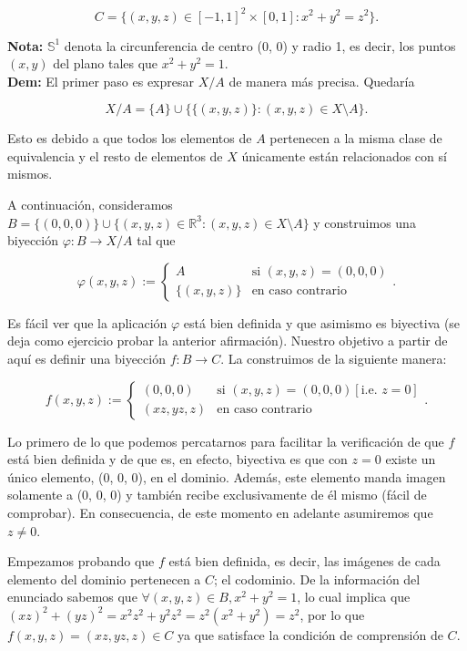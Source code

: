 \documentclass{article}
\begin{document}
\[C = \{(x, y, z) \in [-1, 1]^2 \times [0, 1] : x^2 + y^2 = z^2\}.\]

\noindent\textbf{Nota: }$\mathbb{S}^1$ denota la circunferencia de centro (0, 0) y radio 1, es decir, los puntos $(x, y)$ del plano tales que $x^2 + y^2 = 1$. \\

\noindent\textbf{Dem:} El primer paso es expresar $X/A$ de manera más precisa. Quedaría

\[X/A = \{A\} \cup \{\{(x, y, z)\} : (x, y, z) \in X\setminus A\}.\]

Esto es debido a que todos los elementos de $A$ pertenecen a la misma clase de equivalencia y el resto de elementos de $X$ únicamente están relacionados con sí mismos.

A continuación, consideramos $B = \{(0, 0, 0)\} \cup \{(x, y, z) \in \mathbb{R}^3 : (x, y, z) \in X \setminus A\}$ y construimos una biyección $\varphi : B \longrightarrow X/A$ tal que

\[
\varphi(x, y, z) := 
\begin{cases} 
    A & \text{si } (x, y, z) = (0, 0, 0) \\
    \{(x, y, z)\} & \text{en caso contrario}    
\end{cases}.
\]

Es fácil ver que la aplicación $\varphi$ está bien definida y que asimismo es biyectiva (se deja como ejercicio probar la anterior afirmación). Nuestro objetivo a partir de aquí es definir una biyección $f : B \longrightarrow C$. La construimos de la siguiente manera:

\[
f(x, y, z) := 
\begin{cases}
    (0, 0, 0) & \text{si } (x, y, z) = (0, 0, 0) [\text{i.e. } z = 0] \\
    (xz, yz, z) & \text{en caso contrario}
\end{cases}.
\]

\newpage

Lo primero de lo que podemos percatarnos para facilitar la verificación de que $f$ está bien definida y de que es, en efecto, biyectiva es que con $z = 0$ existe un único elemento, (0, 0, 0), en el dominio. Además, este elemento manda imagen solamente a (0, 0, 0) y también recibe exclusivamente de él mismo (fácil de comprobar). En consecuencia, de este momento en adelante asumiremos que $z \neq 0$.

Empezamos probando que $f$ está bien definida, es decir, las imágenes de cada elemento del dominio pertenecen a $C$; el codominio. De la información del enunciado sabemos que $\forall (x, y, z) \in B, x^2 + y^2 = 1$, lo cual implica que $(xz)^2 + (yz)^2 = x^2z^2 + y^2z^2 = z^2(x^2 + y^2) = z^2$, por lo que $f(x, y, z) = (xz, yz, z) \in C$ ya que satisface la condición de comprensión de $C$.
\end{document}
